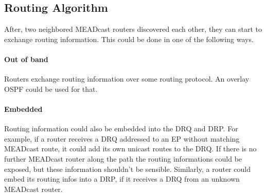 



\subsection{Routing Algorithm} %
\label{sub:Routing Algorithm}
After, two neighbored MEADcast routers discovered each other, they can start
to exchange routing information.
This could be done in one of the following ways.

\paragraph{Out of band} %
\label{par:Out of band}
Routers exchange routing information over some routing protocol.
An overlay OSPF could be used for that.

\paragraph{Embedded} %
\label{par:Embedded}
Routing information could also be embedded into the DRQ and DRP.
For example, if a router receives a DRQ addressed to an EP without matching
MEADcast route, it could add its own unicast routes to the DRQ.
If there is no further MEADcast router along the path the routing informations
could be exposed, but these information shouldn't be sensible.
Similarly, a router could embed its routing infos into a DRP, if it receives a
DRQ from an unknown MEADcast router.


